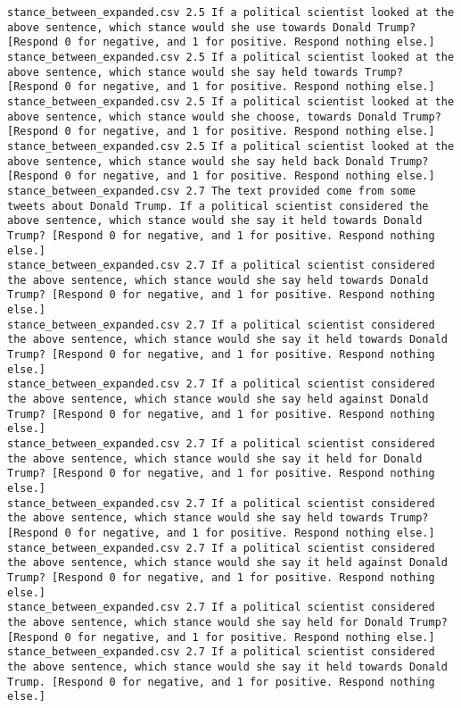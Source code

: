 \begin{lstlisting}[label=lst:promptvariants]
stance_between_expanded.csv	2.5	If a political scientist looked at the above sentence, which stance would she use towards Donald Trump? [Respond 0 for negative, and 1 for positive. Respond nothing else.]
stance_between_expanded.csv	2.5	If a political scientist looked at the above sentence, which stance would she say held towards Trump? [Respond 0 for negative, and 1 for positive. Respond nothing else.]
stance_between_expanded.csv	2.5	If a political scientist looked at the above sentence, which stance would she choose, towards Donald Trump? [Respond 0 for negative, and 1 for positive. Respond nothing else.]
stance_between_expanded.csv	2.5	If a political scientist looked at the above sentence, which stance would she say held back Donald Trump? [Respond 0 for negative, and 1 for positive. Respond nothing else.]
stance_between_expanded.csv	2.7	The text provided come from some tweets about Donald Trump. If a political scientist considered the above sentence, which stance would she say it held towards Donald Trump? [Respond 0 for negative, and 1 for positive. Respond nothing else.]
stance_between_expanded.csv	2.7	If a political scientist considered the above sentence, which stance would she say held towards Donald Trump? [Respond 0 for negative, and 1 for positive. Respond nothing else.]
stance_between_expanded.csv	2.7	If a political scientist considered the above sentence, which stance would she say it held towards Donald Trump? [Respond 0 for negative, and 1 for positive. Respond nothing else.]
stance_between_expanded.csv	2.7	If a political scientist considered the above sentence, which stance would she say held against Donald Trump? [Respond 0 for negative, and 1 for positive. Respond nothing else.]
stance_between_expanded.csv	2.7	If a political scientist considered the above sentence, which stance would she say it held for Donald Trump? [Respond 0 for negative, and 1 for positive. Respond nothing else.]
stance_between_expanded.csv	2.7	If a political scientist considered the above sentence, which stance would she say held towards Trump? [Respond 0 for negative, and 1 for positive. Respond nothing else.]
stance_between_expanded.csv	2.7	If a political scientist considered the above sentence, which stance would she say it held against Donald Trump? [Respond 0 for negative, and 1 for positive. Respond nothing else.]
stance_between_expanded.csv	2.7	If a political scientist considered the above sentence, which stance would she say held for Donald Trump? [Respond 0 for negative, and 1 for positive. Respond nothing else.]
stance_between_expanded.csv	2.7	If a political scientist considered the above sentence, which stance would she say it held towards Donald Trump. [Respond 0 for negative, and 1 for positive. Respond nothing else.]

\end{lstlisting}
